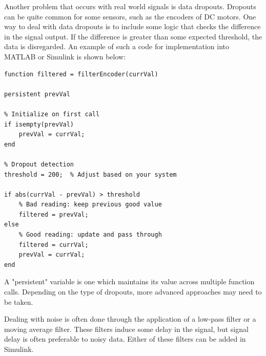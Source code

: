 Another problem that occurs with real world signals is data dropouts. Dropouts can be quite common for some sensors, such as the encoders of DC motors. One way to deal with data dropouts is to include some logic that checks the difference in the signal output. If the difference is greater than some expected threshold, the data is disregarded. An example of such a code for implementation into MATLAB or Simulink is shown below:
\begin{lstlisting}[style=Matlab-editor]
function filtered = filterEncoder(currVal)

persistent prevVal

% Initialize on first call
if isempty(prevVal)
    prevVal = currVal;
end

% Dropout detection
threshold = 200;  % Adjust based on your system

if abs(currVal - prevVal) > threshold
    % Bad reading: keep previous good value
    filtered = prevVal;
else
    % Good reading: update and pass through
    filtered = currVal;
    prevVal = currVal;
end
\end{lstlisting}

A "persistent" variable is one which maintains its value across multiple function calls. Depending on the type of dropouts, more advanced approaches may need to be taken.

Dealing with noise is often done through the application of a low-pass filter or a moving average filter. These filters induce some delay in the signal, but signal delay is often preferable to noisy data. Either of these filters can be added in Simulink.

\newpage
\printendnotes